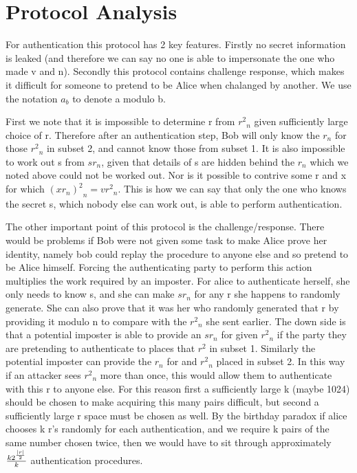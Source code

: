 \documentclass{article}
\begin{document}
\section{Protocol Analysis}

For authentication this protocol has 2 key features.
Firstly no secret information is leaked (and therefore we can say no one is able to impersonate the one who made v and n).
Secondly this protocol contains challenge response, which makes it difficult for someone to pretend to be Alice when chalanged by another.
We use the notation ${a_b}$ to denote a modulo b.

First we note that it is impossible to determine r from ${r^2}_n$ given sufficiently large choice of r.
Therefore after an authentication step, Bob will only know the $r_n$ for those ${r^2}_n$ in subset 2, and cannot know those from subset 1.
It is also impossible to work out s from ${sr}_n$, given that details of s are hidden behind the $r_n$ which we noted above could not be worked out.
Nor is it possible to contrive some r and x for which ${({xr}_n)^2}_n = {vr^2}_n$.
This is how we can say that only the one who knows the secret s, which nobody else can work out, is able to perform authentication.

The other important point of this protocol is the challenge/response.
There would be problems if Bob were not given some task to make Alice prove her identity, namely bob could replay the procedure to anyone else and so pretend to be Alice himself.
Forcing the authenticating party to perform this action multiplies the work required by an imposter.
For alice to authenticate herself, she only needs to know s, and she can make ${sr}_n$ for any r she happens to randomly generate.
She can also prove that it was her who randomly generated that r by providing it modulo n to compare with the ${r^2}_n$ she sent earlier.
The down side is that a potential imposter is able to provide an ${sr}_n$ for given ${r^2}_n$ if the party they are pretending to authenticate to places that $r^2$ in subset 1.
Similarly the potential imposter can provide the $r_n$ for and ${r^2}_n$ placed in subset 2.
In this way if an attacker sees ${r^2}_n$ more than once, this would allow them to authenticate with this r to anyone else.
For this reason first a sufficiently large k (maybe 1024) should be chosen to make acquiring this many pairs difficult, but second a sufficiently large r space must be chosen as well.
By the birthday paradox if alice chooses k r's randomly for each authentication, and we require k pairs of the same number chosen twice, then we would have to sit through approximately ${k 2^{|r| \over 2}} \over {k}$ authentication procedures.
\end{document}

